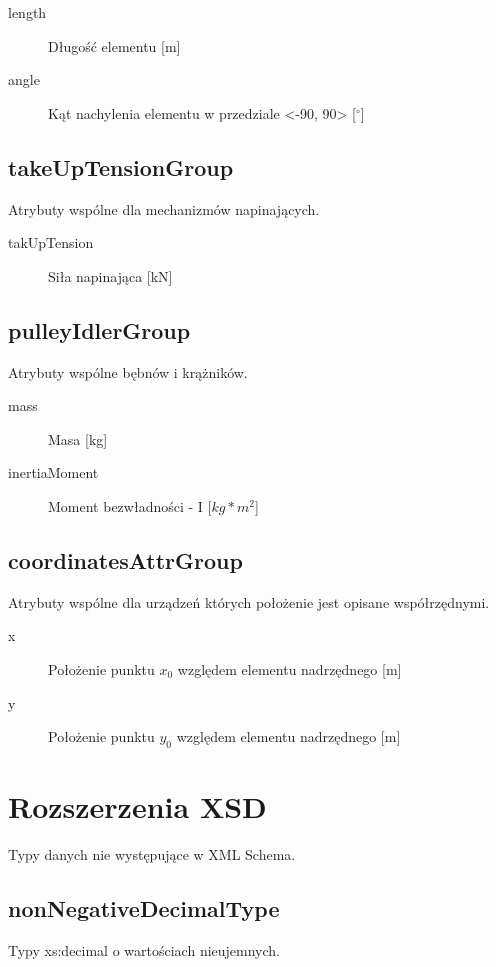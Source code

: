 \documentclass[12pt,a4paper]{article}
\begin{document}
\begin{description}
\item[length] Długość elementu [m]
\item[angle] Kąt nachylenia elementu w przedziale <-90, 90> [$^\circ$] 
\end{description}

\subsection{takeUpTensionGroup}
Atrybuty wspólne dla mechanizmów napinających.

\begin{description}
\item[takUpTension] Siła napinająca [kN]
\end{description}

\subsection{pulleyIdlerGroup}
Atrybuty wspólne bębnów i krążników.

\begin{description}
\item[mass] Masa [kg]
\item[inertiaMoment] Moment bezwładności - I [$kg*m^2$]
\end{description}

\subsection{coordinatesAttrGroup}
Atrybuty wspólne dla urządzeń których położenie jest opisane współrzędnymi.

\begin{description}
\item[x] Położenie punktu $x_0$ względem elementu nadrzędnego [m]
\item[y] Położenie punktu $y_0$ względem elementu nadrzędnego [m]
\end{description}

\section{Rozszerzenia XSD}
Typy danych nie występujące w XML Schema.

\subsection{nonNegativeDecimalType}
Typy xs:decimal o wartościach nieujemnych.
\end{document}
